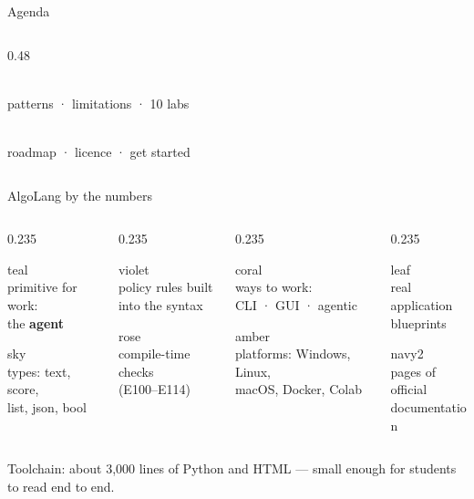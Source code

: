 \documentclass[aspectratio=169,11pt]{beamer}
\newcommand{\stat}[3]{\begin{tile}{#1}{\heavy\fontsize{24}{26}\selectfont #2}\\[1mm]{\scriptsize #3}\end{tile}}
\begin{document}
\begin{frame}{Agenda}
\begin{columns}[T]
\begin{column}{0.48\textwidth}
\begin{tcolorbox}[enhanced,colback=lilac,colframe=lilac,arc=3pt,boxrule=0pt,left=4pt,right=4pt,top=2.5pt,bottom=2.5pt,before skip=0pt,after skip=2.6pt]
\enspace
\parbox[c]{0.8\linewidth}{\color{white}{\bfseries\small Responsible AI \& teaching}\\[-0.6mm]{\scriptsize patterns · limitations · 10 labs}}
\end{tcolorbox}
\begin{tcolorbox}[enhanced,colback=gold,colframe=gold,arc=3pt,boxrule=0pt,left=4pt,right=4pt,top=2.5pt,bottom=2.5pt,before skip=0pt,after skip=2.6pt]
\enspace
\parbox[c]{0.8\linewidth}{\color{white}{\bfseries\small Open-source project}\\[-0.6mm]{\scriptsize roadmap · licence · get started}}
\end{tcolorbox}
\end{column}
\end{columns}
\end{frame}

\begin{frame}{AlgoLang by the numbers}
\vspace{2mm}
\begin{columns}[T]
\begin{column}{0.235\textwidth}\stat{teal}{1}{primitive for work:\\ the \textbf{agent}}\stat{sky}{5}{types: text, score,\\list, json, bool}\end{column}
\begin{column}{0.235\textwidth}\stat{violet}{5}{policy rules built\\into the syntax}\stat{rose}{15}{compile-time checks\\(E100--E114)}\end{column}
\begin{column}{0.235\textwidth}\stat{coral}{3}{ways to work:\\CLI · GUI · agentic}\stat{amber}{5}{platforms: Windows, Linux,\\macOS, Docker, Colab}\end{column}
\begin{column}{0.235\textwidth}\stat{leaf}{8}{real application\\blueprints}\stat{navy2}{77}{pages of official\\documentation}\end{column}
\end{columns}
\vspace{1mm}
{\scriptsize\color{muted} Toolchain: about 3,000 lines of Python and HTML — small enough for students to read end to end.}
\end{frame}
\end{document}

